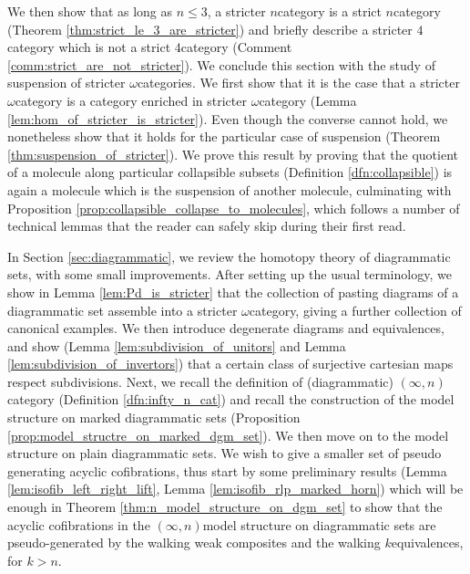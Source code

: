 We then show that as long as \( n \le 3 \), a stricter \( n \)\nbd category is a strict \( n \)\nbd category (Theorem \ref{thm:strict_le_3_are_stricter}) and briefly describe a stricter \( 4 \)\nbd category which is not a strict \( 4 \)\nbd category (Comment \ref{comm:strict_are_not_stricter}).
We conclude this section with the study of suspension of stricter \( \omega \)\nbd categories.
We first show that it is the case that a stricter \( \omega \)\nbd category is a category enriched in stricter \( \omega \)\nbd category (Lemma \ref{lem:hom_of_stricter_is_stricter}).
Even though the converse cannot hold, we nonetheless show that it holds for the particular case of suspension (Theorem \ref{thm:suspension_of_stricter}).
We prove this result by proving that the quotient of a molecule along particular collapsible subsets (Definition \ref{dfn:collapsible}) is again a molecule which is the suspension of another molecule, culminating with Proposition \ref{prop:collapsible_collapse_to_molecules}, which follows a number of technical lemmas that the reader can safely skip during their first read.

In Section \ref{sec:diagrammatic}, we review the homotopy theory of diagrammatic sets, with some small improvements. 
After setting up the usual terminology, we show in Lemma \ref{lem:Pd_is_stricter} that the collection of pasting diagrams of a diagrammatic set assemble into a stricter \( \omega \)\nbd category, giving a further collection of canonical examples.
We then introduce degenerate diagrams and equivalences, and show (Lemma \ref{lem:subdivision_of_unitors} and Lemma \ref{lem:subdivision_of_invertors}) that a certain class of surjective cartesian maps respect subdivisions.
Next, we recall the definition of (diagrammatic) \( (\infty, n) \)\nbd category (Definition \ref{dfn:infty_n_cat}) and recall the construction of the model structure on marked diagrammatic sets (Proposition \ref{prop:model_structre_on_marked_dgm_set}).
We then move on to the model structure on plain diagrammatic sets. 
We wish to give a smaller set of pseudo generating acyclic cofibrations, thus start by some preliminary results (Lemma \ref{lem:isofib_left_right_lift}, Lemma \ref{lem:isofib_rlp_marked_horn}) which will be enough in Theorem \ref{thm:n_model_structure_on_dgm_set} to show that the acyclic cofibrations in the \( (\infty, n) \)\nbd model structure on diagrammatic sets are pseudo-generated by the walking weak composites and the walking \( k \)\nbd equivalences, for \( k > n \). 

